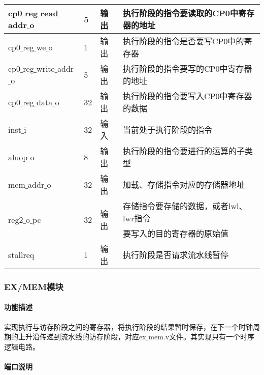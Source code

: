 \begin{longtable}{|l|l|l|l|}
		\hline
		cp0$\_$reg$\_$read$\_$addr$\_$o & 5 & 输出 & 执行阶段的指令要读取的CP0中寄存器的地址 \\
		\hline
		cp0$\_$reg$\_$we$\_$o & 1 & 输出 & 执行阶段的指令是否要写CP0中的寄存器 \\
		\hline
		cp0$\_$reg$\_$write$\_$addr$\_$o & 5 & 输出 & 执行阶段的指令要写的CP0中寄存器的地址 \\
		\hline
		cp0$\_$reg$\_$data$\_$o & 32 & 输出 & 执行阶段的指令要写入CP0中寄存器的数据 \\
		\hline
		inst$\_$i & 32 & 输入 & 当前处于执行阶段的指令 \\
		\hline
		aluop$\_$o & 8 & 输出 & 执行阶段的指令要进行的运算的子类型 \\
		\hline
		mem$\_$addr$\_$o & 32 & 输出 & 加载、存储指令对应的存储器地址 \\
		\hline
		\multirow{2}{*}{reg2$\_$o$\_$pc} & \multirow{2}{*}{32} & \multirow{2}{*}{输出} & 存储指令要存储的数据，或者lwl、lwr指令 \\
		& & & 要写入的目的寄存器的原始值 \\
		\hline
		stallreq & 1 & 输出 & 执行阶段是否请求流水线暂停 \\
		\hline
	\end{longtable}
\subsubsection{EX/MEM模块}
\paragraph{功能描述}
\quad

\quad

实现执行与访存阶段之间的寄存器，将执行阶段的结果暂时保存，在下一个时钟周期的上升沿传递到流水线的访存阶段，对应ex$\_$mem.v文件。其实现只有一个时序逻辑电路。
\paragraph{端口说明}
\quad

